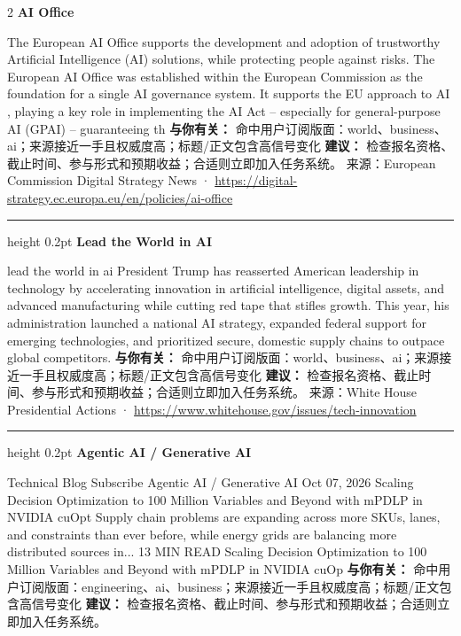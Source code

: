 \documentclass[10.5pt]{ctexart}
\begin{document}
\begin{multicols}{2}
{\large\bfseries AI Office}\par
The European AI Office supports the development and adoption of trustworthy Artificial Intelligence (AI) solutions, while protecting people against risks. The European AI Office was established within the European Commission as the foundation for a single AI governance system. It supports the EU approach to AI , playing a key role in implementing the AI Act – especially for general-purpose AI (GPAI) – guaranteeing th
\textbf{与你有关：} 命中用户订阅版面：world、business、ai；来源接近一手且权威度高；标题/正文包含高信号变化
\textbf{建议：} 检查报名资格、截止时间、参与形式和预期收益；合适则立即加入任务系统。
{\footnotesize\color{ormuted} 来源：European Commission Digital Strategy News · \url{https://digital-strategy.ec.europa.eu/en/policies/ai-office}}
\vspace{2mm}
\hrule height 0.2pt
\vspace{2mm}
{\large\bfseries Lead the World in AI}\par
lead the world in ai President Trump has reasserted American leadership in technology by accelerating innovation in artificial intelligence, digital assets, and advanced manufacturing while cutting red tape that stifles growth. This year, his administration launched a national AI strategy, expanded federal support for emerging technologies, and prioritized secure, domestic supply chains to outpace global competitors.
\textbf{与你有关：} 命中用户订阅版面：world、business、ai；来源接近一手且权威度高；标题/正文包含高信号变化
\textbf{建议：} 检查报名资格、截止时间、参与形式和预期收益；合适则立即加入任务系统。
{\footnotesize\color{ormuted} 来源：White House Presidential Actions · \url{https://www.whitehouse.gov/issues/tech-innovation}}
\vspace{2mm}
\hrule height 0.2pt
\vspace{2mm}
{\large\bfseries Agentic AI / Generative AI}\par
Technical Blog Subscribe Agentic AI / Generative AI Oct 07, 2026 Scaling Decision Optimization to 100 Million Variables and Beyond with mPDLP in NVIDIA cuOpt Supply chain problems are expanding across more SKUs, lanes, and constraints than ever before, while energy grids are balancing more distributed sources in... 13 MIN READ Scaling Decision Optimization to 100 Million Variables and Beyond with mPDLP in NVIDIA cuOp
\textbf{与你有关：} 命中用户订阅版面：engineering、ai、business；来源接近一手且权威度高；标题/正文包含高信号变化
\textbf{建议：} 检查报名资格、截止时间、参与形式和预期收益；合适则立即加入任务系统。

\end{multicols}
\end{document}
